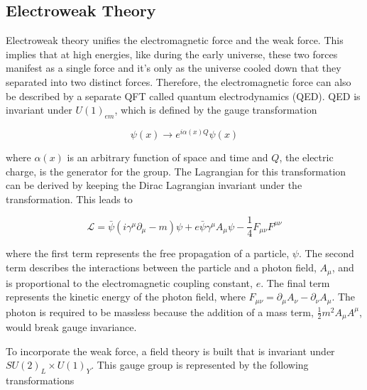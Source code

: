 \subsection{Electroweak Theory}
\label{sec:ElelctroW}

Electroweak theory unifies the electromagnetic force and the weak force. This implies that at high energies, like during the early universe, these two forces manifest as a single force and it's only as the universe cooled down that they separated into two distinct forces. Therefore, the electromagnetic force can also be described by a separate QFT called quantum electrodynamics (QED). QED is invariant under $U(1)_{em}$, which is defined by the gauge transformation

\begin{equation}
\psi(x)\rightarrow e^{i\alpha(x)Q}\psi(x)
\end{equation}

\noindent
where $\alpha(x)$ is an arbitrary function of space and time and $Q$, the electric charge, is the generator for the group. The Lagrangian for this transformation can be derived by keeping the Dirac Lagrangian invariant under the transformation. This leads to

\begin{equation}
\mathcal{L}= \bar{\psi}(i\gamma^{\mu}\partial_{\mu} - m)\psi + e\bar{\psi}\gamma^{\mu}A_{\mu}\psi - \frac{1}{4}F_{\mu\nu}F^{\mu\nu}
\end{equation}

\noindent
where the first term represents the free propagation of a particle, $\psi$. The second term describes the interactions between the particle and a photon field, $A_{\mu}$, and is proportional to the electromagnetic coupling constant, $e$. The final term represents the kinetic energy of the photon field, where $F_{\mu\nu}=\partial_{\mu}A_{\nu}-\partial_{\nu}A_{\mu}$. The photon is required to be massless because the addition of a mass term, $\frac{1}{2}m^{2}A_{\mu}A^{\mu}$, would break gauge invariance. 

To incorporate the weak force, a field theory is built that is invariant under $SU(2)_{L}\times U(1)_{Y}$. This gauge group is represented by the following transformations


